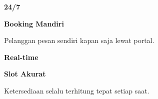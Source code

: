 \documentclass[a4paper]{article}
\begin{document}
\begin{minipage}[t]{0.485\textwidth}
    \noindent\colorbox{BlueBg}{%
        \begin{minipage}[t][2.7cm][c]{\dimexpr\linewidth-2\fboxsep\relax}
            \centering
            {\fontsize{20}{24}\selectfont\bfseries\color{BluePrimary} 24/7}\par\vspace{2pt}
            {\fontsize{9.5}{12}\selectfont\bfseries\color{BlueDark} Booking Mandiri}\par\vspace{2pt}
            {\fontsize{8.5}{11}\selectfont\color{TextDark}Pelanggan pesan sendiri kapan saja lewat portal.}
        \end{minipage}}\par
    \vspace{6pt}
    \noindent\colorbox{BlueBg}{%
        \begin{minipage}[t][2.7cm][c]{\dimexpr\linewidth-2\fboxsep\relax}
            \centering
            {\fontsize{20}{24}\selectfont\bfseries\color{BluePrimary} Real-time}\par\vspace{2pt}
            {\fontsize{9.5}{12}\selectfont\bfseries\color{BlueDark} Slot Akurat}\par\vspace{2pt}
            {\fontsize{8.5}{11}\selectfont\color{TextDark}Ketersediaan selalu terhitung tepat setiap saat.}
        \end{minipage}}%
\end{minipage}

\vspace{8pt}
\end{document}
